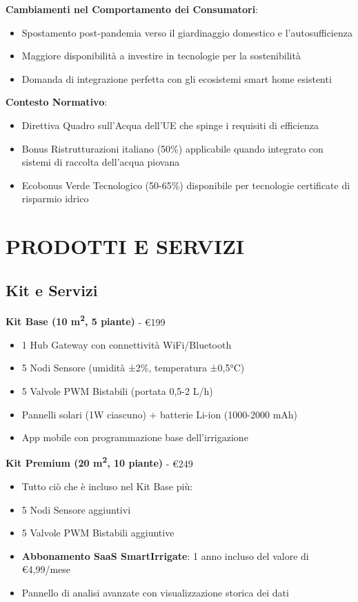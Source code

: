 \documentclass[11pt,a4paper]{report}
\begin{document}
\textbf{Cambiamenti nel Comportamento dei Consumatori}:
\begin{itemize}
    \item Spostamento post-pandemia verso il giardinaggio domestico e l'autosufficienza
    \item Maggiore disponibilità a investire in tecnologie per la sostenibilità
    \item Domanda di integrazione perfetta con gli ecosistemi smart home esistenti
\end{itemize}

\textbf{Contesto Normativo}:
\begin{itemize}
    \item Direttiva Quadro sull'Acqua dell'UE che spinge i requisiti di efficienza
    \item Bonus Ristrutturazioni italiano (50\%) applicabile quando integrato con sistemi di raccolta dell'acqua piovana
    \item Ecobonus Verde Tecnologico (50-65\%) disponibile per tecnologie certificate di risparmio idrico
\end{itemize}

\chapter{PRODOTTI E SERVIZI}

\section{Kit e Servizi}

\textbf{Kit Base (10 m\textsuperscript{2}, 5 piante)} - €199
\begin{itemize}
    \item 1 Hub Gateway con connettività WiFi/Bluetooth
    \item 5 Nodi Sensore (umidità ±2\%, temperatura ±0,5°C)
    \item 5 Valvole PWM Bistabili (portata 0,5-2 L/h)
    \item Pannelli solari (1W ciascuno) + batterie Li-ion (1000-2000 mAh)
    \item App mobile con programmazione base dell'irrigazione
\end{itemize}

\textbf{Kit Premium (20 m\textsuperscript{2}, 10 piante)} - €249
\begin{itemize}
    \item Tutto ciò che è incluso nel Kit Base più:
    \item 5 Nodi Sensore aggiuntivi
    \item 5 Valvole PWM Bistabili aggiuntive
    \item \textbf{Abbonamento SaaS SmartIrrigate}: 1 anno incluso del valore di €4,99/mese
    \item Pannello di analisi avanzate con visualizzazione storica dei dati
\end{itemize}
\end{document}
